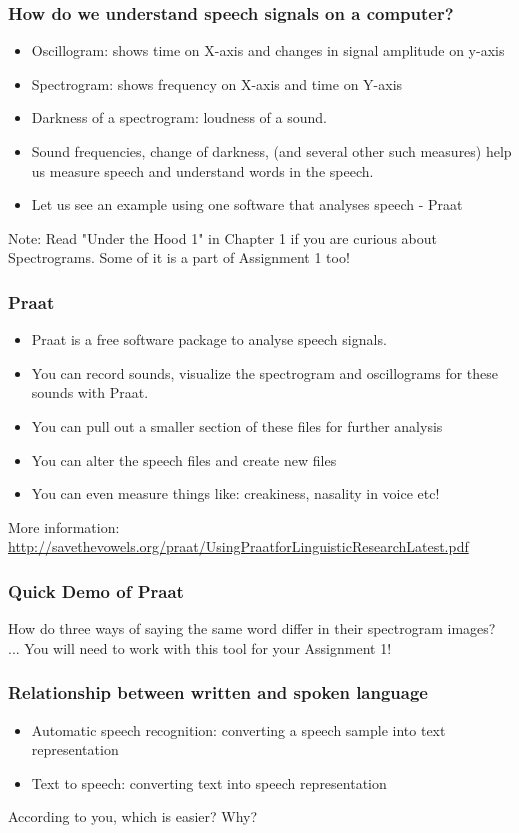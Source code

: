 \documentclass{beamer}
\begin{document}
\begin{frame}
\frametitle{How do we understand speech signals on a computer?}
\begin{itemize}
\item Oscillogram: shows time on X-axis and changes in signal amplitude on y-axis 
\item Spectrogram: shows frequency on X-axis and time on Y-axis
\item Darkness of a spectrogram: loudness of a sound.
\item Sound frequencies, change of darkness, (and several other such measures) help us measure speech and understand words in the speech. \pause
\item Let us see an example using one software that analyses speech - Praat \pause 
\end{itemize}
Note: Read "Under the Hood 1" in Chapter 1 if you are curious about Spectrograms. Some of it is a part of Assignment 1 too!
\end{frame}

\begin{frame}
\frametitle{Praat}
\begin{itemize}
\item Praat is a free software package to analyse speech signals.
\item You can record sounds, visualize the spectrogram and oscillograms for these sounds with Praat.
\item You can pull out a smaller section of these files for further analysis
\item You can alter the speech files and create new files
\item You can even measure things like: creakiness, nasality in voice etc!
\end{itemize}
More information: \url{http://savethevowels.org/praat/UsingPraatforLinguisticResearchLatest.pdf}
\end{frame}

\begin{frame}
\frametitle{Quick Demo of Praat}
How do three ways of saying the same word differ in their spectrogram images? \pause \\ 
... You will need to work with this tool for your Assignment 1!
\end{frame}

\begin{frame}
\frametitle{Relationship between written and spoken language}
\begin{itemize}
\item Automatic speech recognition: converting a speech sample into text representation
\item Text to speech: converting text into speech representation
\end{itemize}
\pause According to you, which is easier? Why?
\end{frame}
\end{document}

